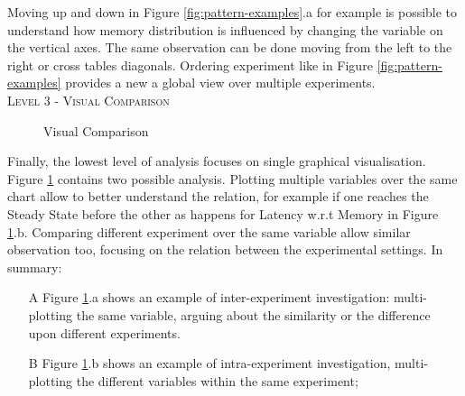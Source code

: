 Moving up and down in Figure \ref{fig:pattern-examples}.a for example is possible to understand how memory distribution is influenced by changing the variable on the vertical axes. The same observation can be done moving from the left to the right or cross tables diagonals. Ordering experiment like in Figure \ref{fig:pattern-examples} provides a new a global view over multiple experiments.\\

\textsc{Level 3 - Visual Comparison}\\

\begin{figure}[tbh]
  \centering
  \caption{Visual Comparison} 
  \label{fig:visual-comp}
\end{figure}

Finally, the lowest level of analysis focuses on single graphical visualisation. Figure \ref{fig:visual-comp} contains two possible analysis. Plotting multiple variables over the same chart allow to better understand the relation, for example if one reaches the Steady State before the other as happens for Latency w.r.t Memory in Figure \ref{fig:visual-comp}.b. Comparing different experiment over the same variable allow similar observation too, focusing on the relation between the experimental settings. In summary:

\begin{enumerate}
\item[A] Figure \ref{fig:visual-comp}.a shows an example of inter-experiment investigation: multi-plotting the same variable, arguing about the similarity or the difference upon different experiments. 
\item[B] Figure \ref{fig:visual-comp}.b shows an example of intra-experiment investigation, multi-plotting the different variables within the same experiment; 

\end{enumerate}


